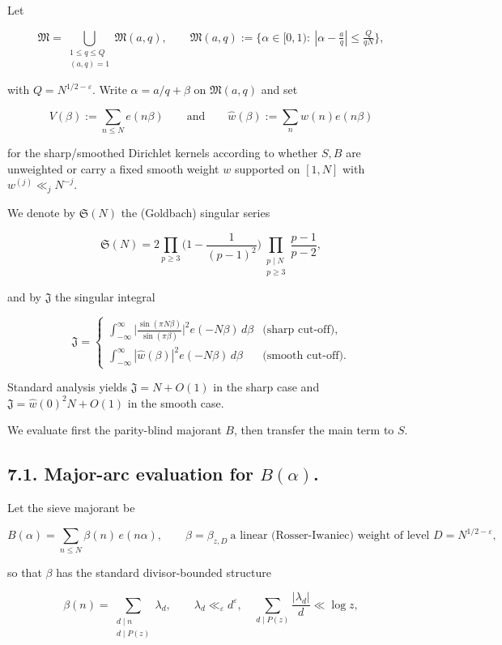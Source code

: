 \documentclass[11pt]{article}
\theoremstyle{definition}
\theoremstyle{remark}
\begin{document}
Let

$$
	\mathfrak M=\bigcup_{\substack{1\le q\le Q\\(a,q)=1}}\mathfrak M(a,q),\qquad
	\mathfrak M(a,q):=\{\alpha\in[0,1):\ |\alpha-\tfrac aq|\le \tfrac{Q}{qN}\},
$$

with $Q=N^{1/2-\varepsilon}$. Write $\alpha=a/q+\beta$ on $\mathfrak M(a,q)$ and set

$$
	V(\beta):=\sum_{n\le N}e(n\beta) \qquad\text{and}\qquad \widehat w(\beta):=\sum_{n}w(n)e(n\beta)
$$

for the sharp/smoothed Dirichlet kernels according to whether $S, B$ are unweighted or carry a fixed smooth weight $w$ supported on $[1,N]$ with $w^{(j)}\ll_j N^{-j}$.

We denote by $\mathfrak S(N)$ the (Goldbach) singular series

$$
	\mathfrak S(N)=2\prod_{p\ge 3}\Big(1-\frac1{(p-1)^2}\Big)
	\prod_{\substack{p\mid N\\ p\ge 3}}\frac{p-1}{p-2},
$$

and by $\mathfrak J$ the singular integral

$$
	\mathfrak J=
	\begin{cases}
		\displaystyle \int_{-\infty}^{\infty}\Big|\frac{\sin(\pi N\beta)}{\sin(\pi\beta)}\Big|^{\!2}e(-N\beta)\,d\beta
		 & \text{(sharp cut-off)},  \\[2ex]
		\displaystyle \int_{-\infty}^{\infty}|\widehat w(\beta)|^{2}e(-N\beta)\,d\beta
		 & \text{(smooth cut-off)}.
	\end{cases}
$$

Standard analysis yields $\mathfrak J=N+O(1)$ in the sharp case and $\mathfrak J=\widehat w(0)^2 N+O(1)$ in the smooth case.

We evaluate first the parity-blind majorant $B$, then transfer the main term to $S$.

\subsection*{7.1. Major-arc evaluation for $B(\alpha)$.}

Let the sieve majorant be

$$
	B(\alpha)=\sum_{n\le N}\beta(n)\,e(n\alpha),\qquad
	\beta=\beta_{z,D}\ \text{a linear (Rosser-Iwaniec) weight of level }D=N^{1/2-\varepsilon},
$$

so that $\beta$ has the standard divisor-bounded structure

$$
	\beta(n)=\sum_{\substack{d\mid n\\ d\mid P(z)}}\lambda_d,\qquad
	\lambda_d\ll_\varepsilon d^\varepsilon,\quad \sum_{d\mid P(z)}\frac{|\lambda_d|}{d}\ll \log z,
$$
\end{document}
